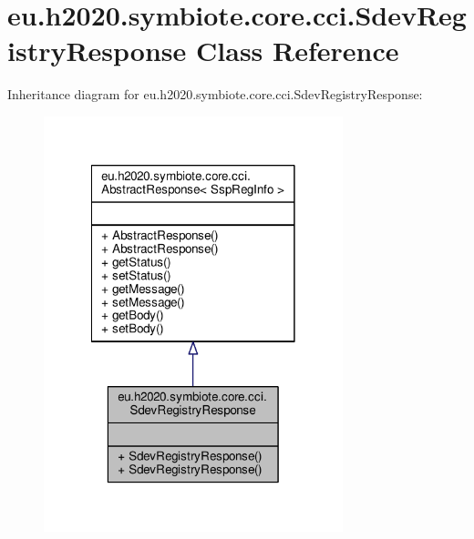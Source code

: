 \hypertarget{classeu_1_1h2020_1_1symbiote_1_1core_1_1cci_1_1SdevRegistryResponse}{}\section{eu.\+h2020.\+symbiote.\+core.\+cci.\+Sdev\+Registry\+Response Class Reference}
\label{classeu_1_1h2020_1_1symbiote_1_1core_1_1cci_1_1SdevRegistryResponse}


Inheritance diagram for eu.\+h2020.\+symbiote.\+core.\+cci.\+Sdev\+Registry\+Response\+:\nopagebreak
\begin{figure}[H]
\begin{center}
\leavevmode
\includegraphics[width=246pt]{classeu_1_1h2020_1_1symbiote_1_1core_1_1cci_1_1SdevRegistryResponse__inherit__graph}
\end{center}
\end{figure}


